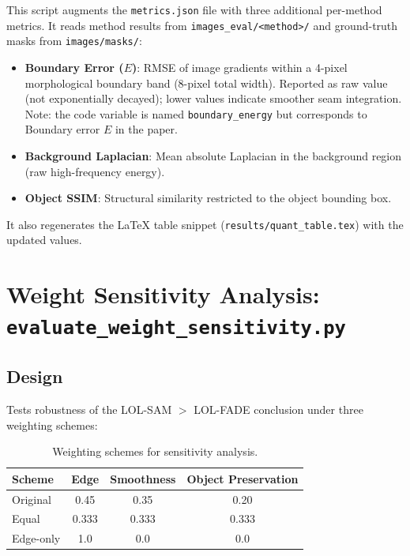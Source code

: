 \documentclass[11pt,a4paper]{article}
\begin{document}
This script augments the \texttt{metrics.json} file with three additional per-method metrics. It reads method results from \texttt{images\_eval/<method>/} and ground-truth masks from \texttt{images/masks/}:

\begin{itemize}
  \item \textbf{Boundary Error ($E$)}: RMSE of image gradients within a 4-pixel morphological boundary band (8-pixel total width). Reported as raw value (not exponentially decayed); lower values indicate smoother seam integration. Note: the code variable is named \texttt{boundary\_energy} but corresponds to Boundary error $E$ in the paper.
  \item \textbf{Background Laplacian}: Mean absolute Laplacian in the background region (raw high-frequency energy).
  \item \textbf{Object SSIM}: Structural similarity restricted to the object bounding box.
\end{itemize}

It also regenerates the \LaTeX{} table snippet (\texttt{results/quant\_table.tex}) with the updated values.

\section{Weight Sensitivity Analysis: \texttt{evaluate\_weight\_sensitivity.py}}

\subsection{Design}

Tests robustness of the LOL-SAM $>$ LOL-FADE conclusion under three weighting schemes:

\begin{table}[h]
\centering
\small
\caption{Weighting schemes for sensitivity analysis.}
\begin{tabular}{lccc}
\toprule
\textbf{Scheme} & \textbf{Edge} & \textbf{Smoothness} & \textbf{Object Preservation} \\
\midrule
Original & 0.45 & 0.35 & 0.20 \\
Equal & 0.333 & 0.333 & 0.333 \\
Edge-only & 1.0 & 0.0 & 0.0 \\
\bottomrule
\end{tabular}
\end{table}
\end{document}
